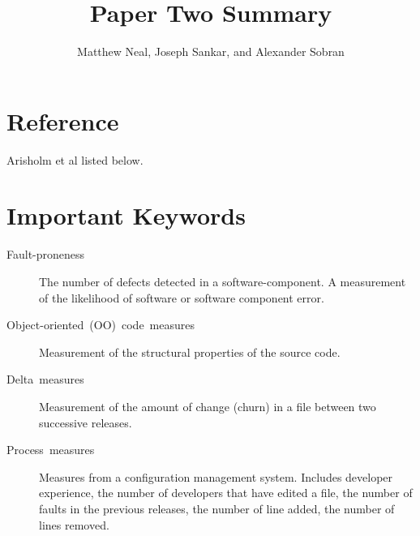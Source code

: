 \documentclass[english]{article}
\begin{document}
\title{Paper Two Summary}


\author{Matthew Neal, Joseph Sankar, and Alexander Sobran}

\maketitle

\section*{Reference}

Arisholm et al \cite{arisholm10} listed below.

\section*{Important Keywords}
\begin{description}
\item [{Fault-proneness}] The number of defects detected in a software-component.
A measurement of the likelihood of software or software component
error. 
\item [{Object-oriented~(OO)~code~measures}] Measurement of the structural
properties of the source code. 
\item [{Delta~measures}] Measurement of the amount of change (churn) in
a file between two successive releases. 
\item [{Process~measures}] Measures from a configuration management system.
Includes developer experience, the number of developers that have
edited a file, the number of faults in the previous releases, the
number of line added, the number of lines removed.
\end{description}
\end{document}
